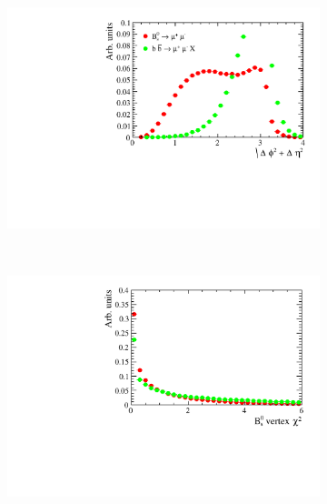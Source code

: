 \begin{figure}[htbp]
    \centering
    \begin{subfigure}[b]{0.4\textwidth}
        \includegraphics[width=\textwidth]{./Figs/Selection/var1_sim_all.pdf}
    \end{subfigure}
    ~ %
    \begin{subfigure}[b]{0.4\textwidth}
       \includegraphics[width=\textwidth]{./Figs/Selection/var2_sim_all.pdf}
    \end{subfigure}


\end{figure}
